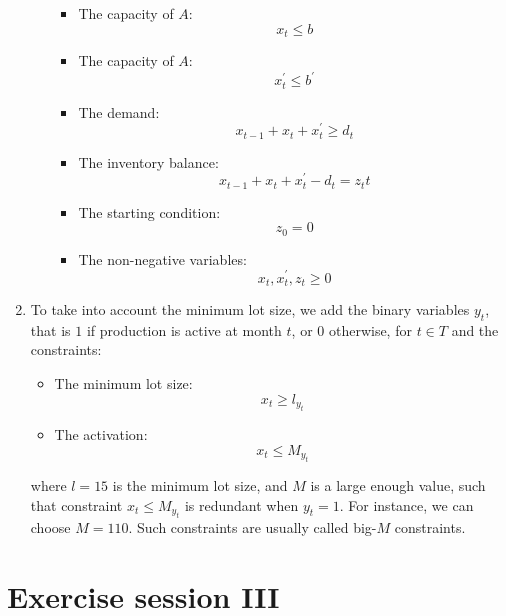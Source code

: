 \documentclass[12pt, a4paper]{report}
\newtheorem[style=M,bodystyle=\normalfont]{theorem}{Theorem}
\newtheorem[style=M,bodystyle=\normalfont]{corollary}{Corollary}
\newtheorem[style=M,bodystyle=\normalfont]{lemma}{Lemma}
\newtheorem[style=M,bodystyle=\normalfont]{definition}{Definition}
\begin{document}
\begin{enumerate}
\begin{itemize}
                        \begin{itemize}
                            \item The capacity of $A$: 
                                \[x_t \leq b\]
                            \item The capacity of $A$: 
                                \[x_t^{'} \leq b^{'}\]
                            \item The demand: 
                                \[x_{t-1}+x_t+x_t^{'} \geq d_t\]
                            \item The inventory balance: 
                                \[x_{t-1}+x_t+x_t^{'}-d_t = z_tt\]
                            \item The starting condition: 
                                \[z_0=0\]
                            \item The non-negative variables: 
                                \[x_t,x_t^{'},z_t \geq 0\]
                            \end{itemize}
                \end{itemize}
            \item To take into account the minimum lot size, we add the binary variables $y_t$, that is $1$ if production is active at month $t$, or $0$ otherwise, for 
                $t \in T$ and the constraints: 
                \begin{itemize}
                    \item The minimum lot size: 
                        \[x_t \geq l_{y_t}\]
                    \item The activation: 
                        \[x_t \leq M_{y_t}\]
                \end{itemize}
                where $l = 15$ is the minimum lot size, and $M$ is a large enough value, such that constraint $x_t \leq M_{y_t}$ is redundant when $y_t=1$. For instance, 
                we can choose $M = 110$. Such constraints are usually called big-$M$ constraints. 
        \end{enumerate}

\newpage

\chapter{Exercise session III}
\end{document}
